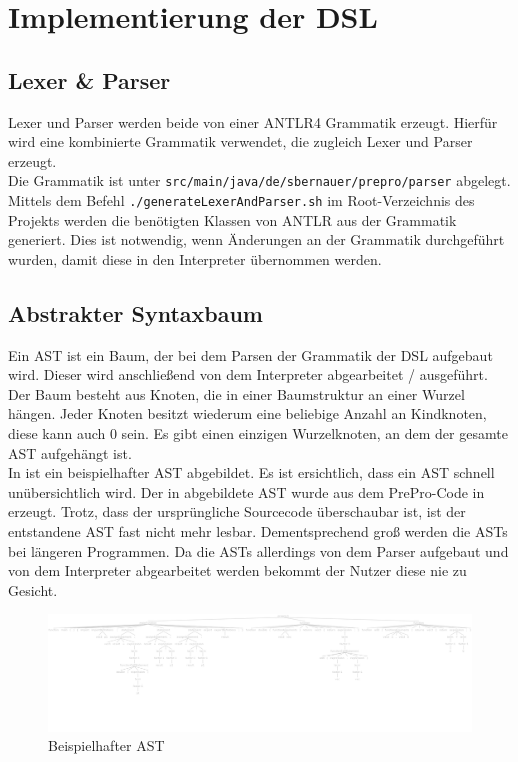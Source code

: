 
\chapter{Implementierung der DSL}

\section{Lexer \& Parser}
Lexer und Parser werden beide von einer ANTLR4 Grammatik erzeugt.
Hierfür wird eine kombinierte Grammatik verwendet, die zugleich Lexer und Parser erzeugt.\\
Die Grammatik ist unter \texttt{src/main/java/de/sbernauer/prepro/parser} abgelegt.
Mittels dem Befehl \texttt{./generateLexerAndParser.sh} im Root-Verzeichnis des Projekts werden die benötigten Klassen von ANTLR aus der Grammatik generiert.
Dies ist notwendig, wenn Änderungen an der Grammatik durchgeführt wurden, damit diese in den Interpreter übernommen werden.

\section{Abstrakter Syntaxbaum}
Ein \ac{AST} ist ein Baum, der bei dem Parsen der Grammatik der \ac{DSL} aufgebaut wird.
Dieser wird anschließend von dem Interpreter abgearbeitet / ausgeführt.\\
Der Baum besteht aus Knoten, die in einer Baumstruktur an einer Wurzel hängen.
Jeder Knoten besitzt wiederum eine beliebige Anzahl an Kindknoten, diese kann auch 0 sein.
Es gibt einen einzigen Wurzelknoten, an dem der gesamte \ac{AST} aufgehängt ist.\\
In  ist ein beispielhafter \ac{AST} abgebildet.
Es ist ersichtlich, dass ein \ac{AST} schnell unübersichtlich wird.
Der in  abgebildete \ac{AST} wurde aus dem PrePro-Code in  erzeugt.
Trotz, dass der ursprüngliche Sourcecode überschaubar ist, ist der entstandene \ac{AST} fast nicht mehr lesbar.
Dementsprechend groß werden die \acp{AST} bei längeren Programmen.
Da die \acp{AST} allerdings von dem Parser aufgebaut und von dem Interpreter abgearbeitet werden bekommt der Nutzer diese nie zu Gesicht.
\begin{figure}[H]
	\centering
	\includegraphics[width=\textwidth]{figures/parseTree}
	\caption{Beispielhafter \ac{AST}}
	\label{fig:AST_Example}
\end{figure}

